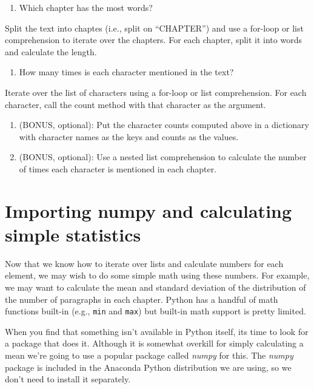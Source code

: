\documentclass[]{book}
\providecommand{\tightlist}{%
  \setlength{\itemsep}{0pt}\setlength{\parskip}{0pt}}
\begin{document}
\begin{enumerate}
\def\labelenumi{\arabic{enumi}.}
\setcounter{enumi}{1}
\tightlist
\item
  Which chapter has the most words?
\end{enumerate}

Split the text into chaptes (i.e., split on ``CHAPTER'') and use a
for-loop or list comprehension to iterate over the chapters. For each
chapter, split it into words and calculate the length.

\begin{enumerate}
\def\labelenumi{\arabic{enumi}.}
\setcounter{enumi}{2}
\tightlist
\item
  How many times is each character mentioned in the text?
\end{enumerate}

Iterate over the list of characters using a for-loop or list
comprehension. For each character, call the count method with that
character as the argument.

\begin{enumerate}
\def\labelenumi{\arabic{enumi}.}
\setcounter{enumi}{3}
\tightlist
\item
  (BONUS, optional): Put the character counts computed above in a
  dictionary with character names as the keys and counts as the values.
\item
  (BONUS, optional): Use a nested list comprehension to calculate the
  number of times each character is mentioned in each chapter.
\end{enumerate}

\section{Importing numpy and calculating simple
statistics}\label{importing-numpy-and-calculating-simple-statistics}

Now that we know how to iterate over lists and calculate numbers for
each element, we may wish to do some simple math using these numbers.
For example, we may want to calculate the mean and standard deviation of
the distribution of the number of paragraphs in each chapter. Python has
a handful of math functions built-in (e.g., \texttt{min} and
\texttt{max}) but built-in math support is pretty limited.

When you find that something isn't available in Python itself, its time
to look for a package that does it. Although it is somewhat overkill for
simply calculating a mean we're going to use a popular package called
\emph{numpy} for this. The \emph{numpy} package is included in the
Anaconda Python distribution we are using, so we don't need to install
it separately.
\end{document}

